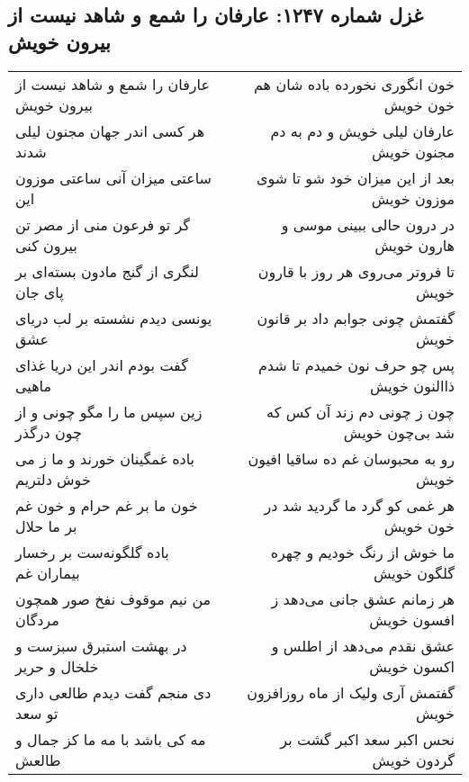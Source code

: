 \begin{center}
\section*{غزل شماره ۱۲۴۷: عارفان را شمع و شاهد نیست از بیرون خویش}
\label{sec:1247}
\begin{longtable}{l p{0.5cm} r}
عارفان را شمع و شاهد نیست از بیرون خویش
&&
خون انگوری نخورده باده شان هم خون خویش
\\
هر کسی اندر جهان مجنون لیلی شدند
&&
عارفان لیلی خویش و دم به دم مجنون خویش
\\
ساعتی میزان آنی ساعتی موزون این
&&
بعد از این میزان خود شو تا شوی موزون خویش
\\
گر تو فرعون منی از مصر تن بیرون کنی
&&
در درون حالی ببینی موسی و هارون خویش
\\
لنگری از گنج مادون بسته‌ای بر پای جان
&&
تا فروتر می‌روی هر روز با قارون خویش
\\
یونسی دیدم نشسته بر لب دریای عشق
&&
گفتمش چونی جوابم داد بر قانون خویش
\\
گفت بودم اندر این دریا غذای ماهیی
&&
پس چو حرف نون خمیدم تا شدم ذاالنون خویش
\\
زین سپس ما را مگو چونی و از چون درگذر
&&
چون ز چونی دم زند آن کس که شد بی‌چون خویش
\\
باده غمگینان خورند و ما ز می خوش دلتریم
&&
رو به محبوسان غم ده ساقیا افیون خویش
\\
خون ما بر غم حرام و خون غم بر ما حلال
&&
هر غمی کو گرد ما گردید شد در خون خویش
\\
باده گلگونه‌ست بر رخسار بیماران غم
&&
ما خوش از رنگ خودیم و چهره گلگون خویش
\\
من نیم موقوف نفخ صور همچون مردگان
&&
هر زمانم عشق جانی می‌دهد ز افسون خویش
\\
در بهشت استبرق سبزست و خلخال و حریر
&&
عشق نقدم می‌دهد از اطلس و اکسون خویش
\\
دی منجم گفت دیدم طالعی داری تو سعد
&&
گفتمش آری ولیک از ماه روزافزون خویش
\\
مه کی باشد با مه ما کز جمال و طالعش
&&
نحس اکبر سعد اکبر گشت بر گردون خویش
\\
\end{longtable}
\end{center}
